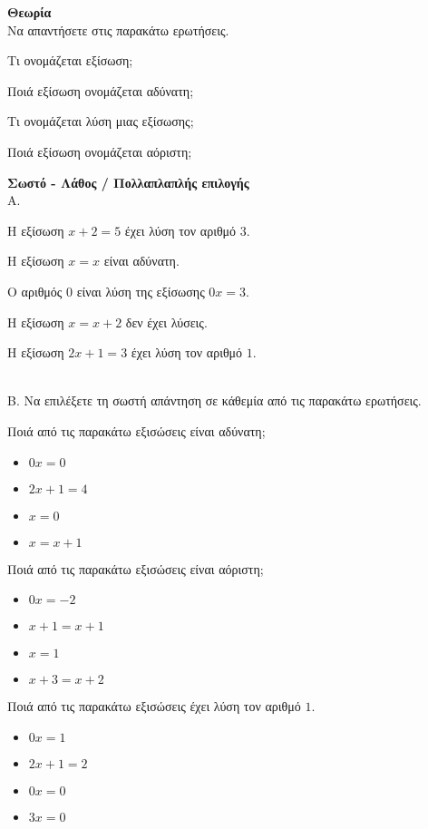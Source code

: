 \documentclass[ektypwsh]{diag-xelatex}
\begin{document}
\thewria
\begin{thema}
\item \textbf{Θεωρία}\\
Να απαντήσετε στις παρακάτω ερωτήσεις.
\begin{rlist}
\item Τι ονομάζεται εξίσωση;
\item Ποιά εξίσωση ονομάζεται αδύνατη;
\item Τι ονομάζεται λύση μιας εξίσωσης;
\item Ποιά εξίσωση ονομάζεται αόριστη;
\end{rlist}
\item \textbf{Σωστό - Λάθος / Πολλαπλαπλής επιλογής}\\
Α. \swstolathosd
\begin{rlist}
\item Η εξίσωση $ x+2=5 $ έχει λύση τον αριθμό $ 3 $.
\item Η εξίσωση $ x=x $ είναι αδύνατη.
\item Ο αριθμός $ 0 $ είναι λύση της εξίσωσης $ 0x=3 $.
\item Η εξίσωση $ x=x+2 $ δεν έχει λύσεις.
\item Η εξίσωση $ 2x+1=3 $ έχει λύση τον αριθμό $ 1 $.
\end{rlist}\\
Β. Να επιλέξετε τη σωστή απάντηση σε κάθεμία από τις παρακάτω ερωτήσεις.
\begin{rlist}
\item Ποιά από τις παρακάτω εξισώσεις είναι αδύνατη;
\begin{multicols}{4}
\begin{itemize}
\item $ 0x=0 $
\item $ 2x+1=4 $
\item $ x=0 $
\item $ x=x+1 $
\end{itemize}
\end{multicols}
\item Ποιά από τις παρακάτω εξισώσεις είναι αόριστη;
\begin{multicols}{4}
\begin{itemize}
\item $ 0x=-2 $
\item $ x+1=x+1 $
\item $ x=1 $
\item $ x+3=x+2 $
\end{itemize}
\end{multicols}
\item Ποιά από τις παρακάτω εξισώσεις έχει λύση τον αριθμό $ 1 $.
\begin{multicols}{4}
\begin{itemize}
\item $ 0x=1 $
\item $ 2x+1=2 $
\item $ 0x=0 $
\item $ 3x=0 $
\end{itemize}
\end{multicols}
\end{rlist}
\end{thema}
\end{document}
